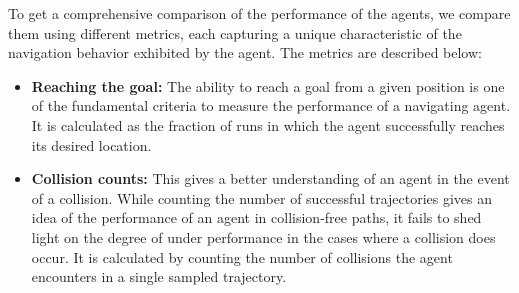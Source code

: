 To get a comprehensive comparison of the performance of the agents, we compare them using different metrics, each capturing a unique characteristic of the navigation behavior exhibited by the agent. The metrics are described below:
\begin{itemize}
        \item \textbf{Reaching the goal:} The ability to reach a goal from a given position is one of the fundamental criteria to measure the performance of a navigating agent. It is calculated as the fraction of runs in which the agent successfully reaches its desired location.        
        
        \item \textbf{Collision counts:} This gives a better understanding of an agent in the event of a collision. While counting the number of successful trajectories gives an idea of the performance of an agent in collision-free paths, it fails to shed light on the degree of under performance in the cases where a collision does occur. It is calculated by counting the number of collisions the agent encounters in a single sampled trajectory.
        


\end{itemize}

